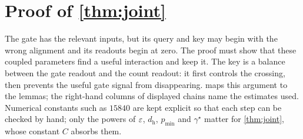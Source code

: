 \begin{table}[htbp]
\centering\small
{}
\caption{\textbf{Scaling checks of the proved bounds.} Rows (b)--(d): two-block Transformer of (A1) at width $16$, $K=2$, with (A2) in
force, float64, exact over all words. (a)~Experiment architecture with $\mathcal N(0,0.02^2)$ parameters, outside (A2), log-linear fits over
$n=2$--$10$. (b)~$n=6$, four letters, one draw, exponents from $\initscale\in\{0.03,0.04,0.05\}$. (c)~Structured $\tilde{\bm\theta}$,
$\initscale\in\{0.02,0.05\}$. (d)~Four uniform letters, fixed query, exponents from $\initscale\in\{0.01,0.02\}$. (e)~Executor of
\cref{prop:represent} at width $2{,}029$ on $532$ prompts.}
\label{tab:verify}
\end{table}

\section{Proof of \texorpdfstring{\cref{thm:joint}}{Theorem 4}}
\label{app:joint}

\providecommand{\why}[1]{\text{\small(#1)}}

The gate has the relevant inputs, but its query and key may begin with the wrong alignment and its readouts begin at zero.
The proof must show that these coupled parameters find a useful interaction and keep it. The key is a balance between the gate
readout and the count readout: it first controls the crossing, then prevents the useful gate signal from disappearing.
 maps this argument to the lemmas; the right-hand columns of displayed chains name the estimates used. Numerical
constants such as $15840$ are kept explicit so that each step can be checked by hand; only the powers of $\varepsilon$, $d_{\mathrm h}$,
$p_{\min}$ and $\gamma^\star$ matter for \cref{thm:joint}, whose constant $C$ absorbs them.

